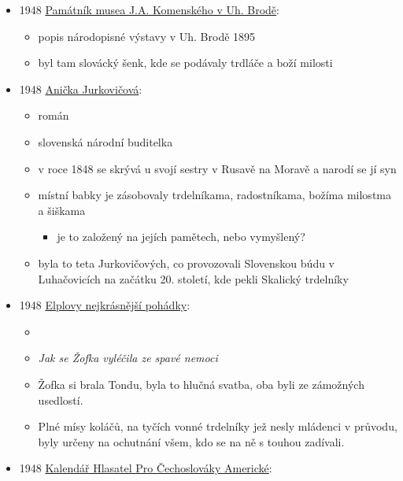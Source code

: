 \begin{itemize}
  \begin{itemize}
  \tightlist
  \item
    Slovensko, recept na Skalický trdelník
  \end{itemize}
\item
  1948
  \href{https://ceskadigitalniknihovna.cz/uuid/uuid:1536d800-488a-11e4-aded-005056827e51}{Památník
  musea J.A. Komenského v Uh. Brodě}:

  \begin{itemize}
  \tightlist
  \item
    popis národopisné výstavy v Uh. Brodě 1895
  \item
    byl tam slovácký šenk, kde se podávaly trdláče a boží milosti
  \end{itemize}
\item
  1948
  \href{https://dikda.snk.sk/uuid/uuid:fe08d509-63e7-4e4f-bf4f-0d9cef56b5a8}{Anička
  Jurkovičová}:

  \begin{itemize}
  \tightlist
  \item
    román
  \item
    slovenská národní buditelka
  \item
    v roce 1848 se skrývá u svojí sestry v Rusavě na Moravě a narodí se
    jí syn
  \item
    místní babky je zásobovaly trdelníkama, radostníkama, božíma
    milostma a šiškama

    \begin{itemize}
    \tightlist
    \item
      je to založený na jejích pamětech, nebo vymyšlený?
    \end{itemize}
  \item
    byla to teta Jurkovičových, co provozovali Slovenskou búdu v
    Luhačovicích na začátku 20. století, kde pekli Skalický trdelníky
  \end{itemize}
\item
  1948
  \href{https://www.digitalniknihovna.cz/mzk/uuid/uuid:5df3ef60-a0f8-11e6-9325-005056827e52}{Elplovy
  nejkrásnější pohádky}:

  \begin{itemize}
  \tightlist
  \item
  \item
    \emph{Jak se Žofka vyléčila ze spavé nemoci}
  \item
    Žofka si brala Tondu, byla to hlučná svatba, oba byli ze zámožných
    usedlostí.
  \item
    Plné mísy koláčů, na tyčích vonné trdelníky jež nesly mládenci v
    průvodu, byly určeny na ochutnání všem, kdo se na ně s touhou
    zadívali.
  \end{itemize}
\item
  1948
  \href{https://www.google.cz/books/edition/Kalend\%C3\%A1\%C5\%99_Hlasatel_Pro_\%C4\%8Cechoslov\%C3\%A1ky_A/O8kdxutB3EwC?hl=en&gbpv=1&bsq=trdeln\%C3\%ADk&dq=trdeln\%C3\%ADk&printsec=frontcover}{Kalendář
  Hlasatel Pro Čechoslováky Americké}:


\end{itemize}
